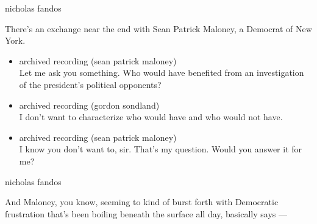 nicholas fandos

There's an exchange near the end with Sean Patrick Maloney, a Democrat
of New York.

\begin{itemize}
\item
  archived recording (sean patrick maloney)\\
  Let me ask you something. Who would have benefited from an
  investigation of the president's political opponents?
\item
  archived recording (gordon sondland)\\
  I don't want to characterize who would have and who would not have.
\item
  archived recording (sean patrick maloney)\\
  I know you don't want to, sir. That's my question. Would you answer it
  for me?
\end{itemize}

nicholas fandos

And Maloney, you know, seeming to kind of burst forth with Democratic
frustration that's been boiling beneath the surface all day, basically
says ---

